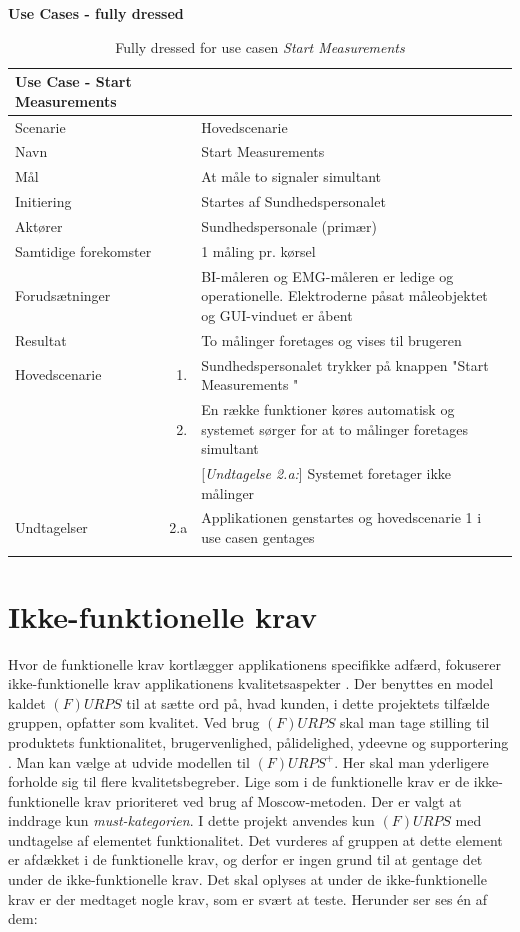 \textbf{Use Cases - fully dressed  } 


\begin{longtabu} to  %
	{\large \textbf{Use Case - Start Measurements }} && \\
	\toprule
	Scenarie 				&&	Hovedscenarie\\
	Navn 					&& 	Start Measurements\\
	Mål 					&& 	At måle to signaler simultant \\
	Initiering 				&& 	Startes af Sundhedspersonalet\\
	Aktører 				&& 	Sundhedspersonale (primær)\\
	
	Samtidige forekomster  	&& 	1 måling pr. kørsel \\
	Forudsætninger 			&&	BI-måleren og EMG-måleren er ledige og operationelle. Elektroderne påsat måleobjektet og GUI-vinduet er åbent \\ 
	Resultat 				&& 	To målinger foretages og vises til brugeren\\ \midrule
	Hovedscenarie 			&    1. 	&	Sundhedspersonalet trykker på knappen "Start Measurements "\\				 	
							&    2. 	& 	En række funktioner køres automatisk og systemet sørger for at to målinger foretages simultant\\
	
	
	&&[\textit{Undtagelse 2.a:}] Systemet foretager ikke målinger\\ \midrule						
							
							
	Undtagelser 			&		2.a	& 	Applikationen genstartes og hovedscenarie 1 i use casen gentages \\ \bottomrule
	
	\caption{Fully dressed for use casen \textit{Start Measurements}}
	\label{UC1}
\end{longtabu}

\pagebreak
\section{Ikke-funktionelle krav}

Hvor de funktionelle krav kortlægger applikationens specifikke adfærd, fokuserer ikke-funktionelle krav applikationens kvalitetsaspekter \cite{ISELektioner}.
Der benyttes en model kaldet $(F)URPS$ til at sætte ord på, hvad kunden, i dette projektets tilfælde gruppen, opfatter som kvalitet. Ved brug $(F)URPS$ skal man tage stilling til produktets funktionalitet, brugervenlighed, pålidelighed, ydeevne og supportering \cite{ISELektioner}. Man kan vælge at udvide  modellen til  $(F)URPS^{+}$. Her skal man yderligere forholde sig til flere kvalitetsbegreber. Lige som i de funktionelle krav er de ikke-funktionelle krav prioriteret ved brug af Moscow-metoden. Der er valgt at inddrage kun \textit{must-kategorien}. I dette projekt anvendes kun $(F)URPS$ med undtagelse af  elementet funktionalitet. Det vurderes af gruppen at  dette element er afdækket i de funktionelle krav, og derfor er ingen grund til at gentage det under de ikke-funktionelle krav. Det skal oplyses at under de ikke-funktionelle krav er der medtaget nogle krav, som er svært at teste. Herunder ser ses én af dem:

